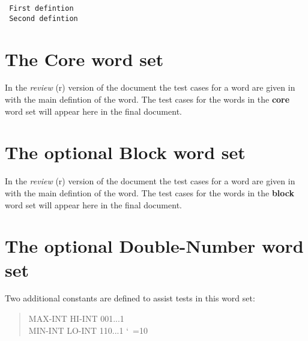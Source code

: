 	\tab \texttt{ First defintion} \\
	\tab \texttt{ Second defintion} \\


\ifinline
	\newcommand{\readtest}[1]{%
		\begin{editor}
			In the \emph{review} (r) version of the document the
			test cases for a word are given in with the main
			defintion of the word.  The test cases for the words
			in the \textbf{#1} word set will appear here in the
			final document.
		\end{editor}
	}

	\newcommand{\testsection}[2]{%
		\section{The optional #2 word set}
		\readtest{#1}
	}

	\newcommand{\defersection}{}
\else
	\defersection{}

	\newcommand{\readtest}[2]{%
		
	}

	\newcommand{\testsection}[2]{%
		\defersection{#2}
		\setwordlist{#1}
		
		\stepsection
	}
\fi


\setcounter{section}{5}
\section{The Core word set} %
\readtest{core}


\testsection{block}{Block}						%


\section{The optional Double-Number word set} %
\defersection{}
\label{test:double}

Two additional constants are defined to assist tests in this word set:

\begin{quote}\ttfamily\frenchspacing\obeyspaces
MAX-INT    HI-INT    001...1 \\
MIN-INT    LO-INT    110...1
\nonfrenchspacing\catcode`\ =10
\end{quote}


